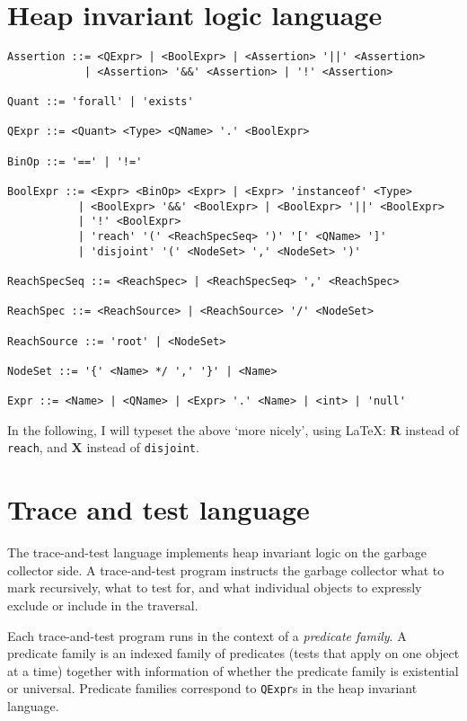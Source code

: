 \documentclass{report}
\newcommand{\reachOp}{\ensuremath{\mathbf{R}}}
\newcommand{\disjointOp}{\ensuremath{\mathbf{X}}}
\begin{document}
\section{Heap invariant logic language}

\begin{verbatim}
Assertion ::= <QExpr> | <BoolExpr> | <Assertion> '||' <Assertion>
            | <Assertion> '&&' <Assertion> | '!' <Assertion>

Quant ::= 'forall' | 'exists'

QExpr ::= <Quant> <Type> <QName> '.' <BoolExpr>

BinOp ::= '==' | '!='

BoolExpr ::= <Expr> <BinOp> <Expr> | <Expr> 'instanceof' <Type>
           | <BoolExpr> '&&' <BoolExpr> | <BoolExpr> '||' <BoolExpr>
           | '!' <BoolExpr>
           | 'reach' '(' <ReachSpecSeq> ')' '[' <QName> ']'
           | 'disjoint' '(' <NodeSet> ',' <NodeSet> ')'

ReachSpecSeq ::= <ReachSpec> | <ReachSpecSeq> ',' <ReachSpec>

ReachSpec ::= <ReachSource> | <ReachSource> '/' <NodeSet>

ReachSource ::= 'root' | <NodeSet>

NodeSet ::= '{' <Name> */ ',' '}' | <Name>

Expr ::= <Name> | <QName> | <Expr> '.' <Name> | <int> | 'null'
\end{verbatim}

In the following, I will typeset the above `more nicely', using LaTeX:
\reachOp{} instead of \texttt{reach}, and \disjointOp{} instead of
\texttt{disjoint}.

\section{Trace and test language}

The trace-and-test language implements heap invariant logic on the
garbage collector side.  A trace-and-test program instructs the
garbage collector what to mark recursively, what to test for, and what
individual objects to expressly exclude or include in the traversal.

Each trace-and-test program runs in the context of a \emph{predicate
  family}.  A predicate family is an indexed family of predicates
(tests that apply on one object at a time) together with information
of whether the predicate family is existential or universal.
Predicate families correspond to \texttt{QExpr}s in the heap invariant
language.
\end{document}
